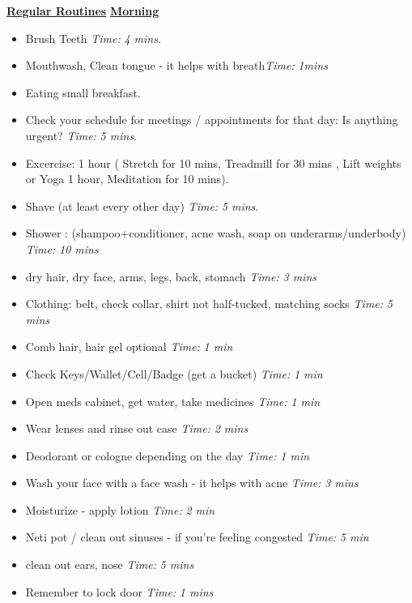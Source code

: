 \documentclass[11pt]{article}
\newcommand{\timeEst}[1]{\textit{Time:} \textit{#1}}
\begin{document}
          \newpage

              {\small \textbf{\underline{Regular Routines}} 
                \underline{\textbf{Morning}}
                \begin{itemize}
                  \tiny \item \tiny Brush Teeth \timeEst{4 mins}.
                \item \tiny Mouthwash, Clean tongue - it helps with breath\timeEst{1mins}
                \item \tiny Eating small breakfast.
                \item \tiny Check your schedule for meetings / appointments for that day: Is anything urgent? \timeEst{5 mins}.
                \item \tiny Excercise: 1 hour ( Stretch for 10 mins, Treadmill for 30 mins , Lift weights or Yoga 1 hour, Meditation for 10 mins).
                \item \tiny Shave (at least every other day) \timeEst{5 mins}.
                \item \tiny Shower : (shampoo+conditioner, acne wash,  soap on underarms/underbody)
                  \timeEst{10 mins}
                \item \tiny dry hair, dry face, arms, legs, back, stomach \timeEst{3 mins}
                \item \tiny Clothing: belt, check collar, shirt not half-tucked, matching socks \timeEst{5 mins}
                \item \tiny Comb hair, hair gel optional \timeEst{ 1 min}
                \item \tiny Check Keys/Wallet/Cell/Badge (get a bucket) \timeEst{1 min}
                \item \tiny Open meds cabinet, get water, take medicines \timeEst{1 min}
                \item \tiny Wear lenses and rinse out case \timeEst{ 2 mins}
                \item \tiny Deodorant or cologne depending on the day \timeEst{1 min}
                \item \tiny Wash your face with a face wash - it helps with acne \timeEst{3 mins}
                \item \tiny Moisturize - apply lotion \timeEst{ 2 min}
                \item \tiny Neti pot / clean out sinuses - if you’re feeling congested \timeEst{5 min}
                \item \tiny clean out ears, nose \timeEst{5 mins}
                \item \tiny Remember to lock door \timeEst{1 mins}
                \end{itemize} 
                
}
\end{document}
